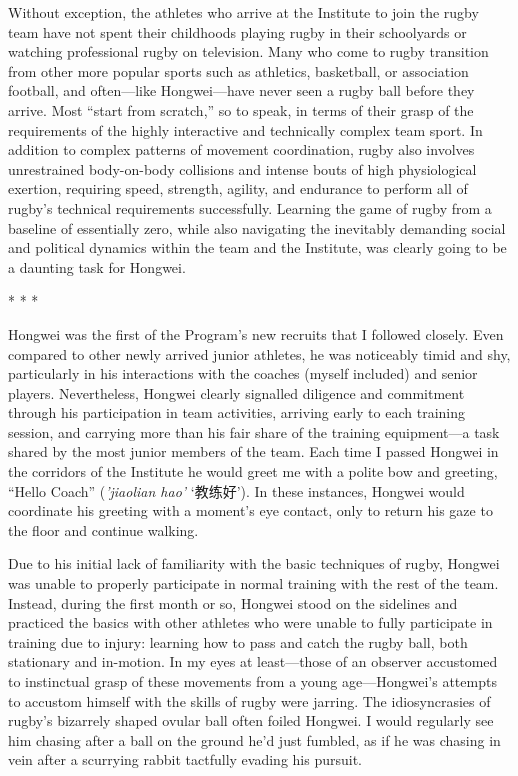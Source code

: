 \begin{CJK}{UTF8}{gbsn}
Without exception, the athletes who arrive at the Institute to join the rugby team have not spent their childhoods playing rugby in their schoolyards or watching professional rugby on television. Many who come to rugby transition from other more popular sports such as athletics, basketball, or association football, and often---like Hongwei---have never seen a rugby ball before they arrive.  Most ``start from scratch,'' so to speak, in terms of their grasp of the requirements of the highly interactive and technically complex team sport. In addition to complex patterns of movement coordination, rugby also involves unrestrained body-on-body collisions and intense bouts of high physiological exertion, requiring speed, strength, agility, and endurance to perform all of rugby's technical requirements successfully.  Learning the game of rugby from a baseline of essentially zero, while also navigating the inevitably demanding  social and political dynamics within the team and the Institute, was clearly going to be a daunting task for Hongwei.

\begin{center}
  * * *
\end{center}

Hongwei was the first of the Program’s new recruits that I followed closely.  Even compared to other newly arrived junior athletes, he was noticeably timid and shy, particularly in his interactions with the coaches (myself included) and senior players. Nevertheless, Hongwei clearly signalled diligence and commitment through his participation in team activities, arriving early to each training session, and carrying more than his fair share of the training equipment---a task shared by the most junior members of the team.  Each time I passed Hongwei in the corridors of the Institute he would greet me with a polite bow and greeting, ``Hello Coach'' (\textit{'jiaolian hao'} `教练好').  In these instances, Hongwei would coordinate his greeting with a moment's eye contact, only to return his gaze to the floor and continue walking.

Due to his initial lack of familiarity with the basic techniques of rugby, Hongwei was unable to properly participate in normal training with the rest of the team.  Instead, during the first month or so, Hongwei stood on the sidelines and practiced the basics with other athletes who were unable to fully participate in training due to injury: learning how to pass and catch the rugby ball, both stationary and in-motion. In my eyes at least---those of an observer accustomed to instinctual grasp of these movements from a young age---Hongwei's attempts to accustom himself with the skills of rugby were jarring.  The idiosyncrasies of rugby's bizarrely shaped ovular ball often foiled Hongwei. I would regularly see him chasing after a ball on the ground he'd just fumbled, as if he was chasing in vein after a scurrying rabbit tactfully evading his pursuit.


\end{CJK}
